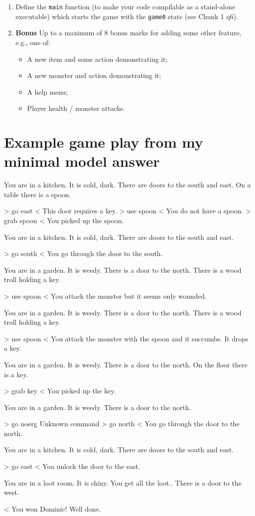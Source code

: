 \documentclass{article}
\newcommand{\topMarks}[1]{\marginnote{(#1 marks)}}
\begin{document}
\begin{enumerate}[leftmargin=1.4em,resume]
\item \topMarks{1} Define the \texttt{main} function (to make your
code compilable as a stand-alone executable) which starts the game
with the \texttt{game0} state (see Chunk 1 q6).

\item \topMarks{8} \textbf{Bonus} Up to a maximum of 8 bonus marks for
adding some other feature, e.g., one of:
%
\begin{itemize}
\item A new item and some action demonstrating it;
\item A new monster and action demonstrating it;
\item A help menu;
\item Player health / monster attacks.
\end{itemize}
%
\end{enumerate}
%

\newpage

\appendix

\section{Example game play from my minimal model answer}

\begin{EVerbatim}
   You are in a kitchen. It is cold, dark.
   There are doors to the south and east.
   On a table there is a spoon.

> go east
< This door requires a key.
> use spoon
< You do not have a spoon.
> grab spoon
< You picked up the spoon.

   You are in a kitchen. It is cold, dark.
   There are doors to the south and east.

> go south
< You go through the door to the south.

   You are in a garden. It is weedy.
   There is a door to the north.
   There is a wood troll holding a key.

> use spoon
< You attack the monster but it seems only wounded.

   You are in a garden. It is weedy.
   There is a door to the north.
   There is a wood troll holding a key.

> use spoon
< You attack the monster with the spoon and it succumbs. It drops a key.

   You are in a garden. It is weedy.
   There is a door to the north.
   On the floor there is a key.

> grab key
< You picked up the key.

   You are in a garden. It is weedy.
   There is a door to the north.

> go noerg
Unknown command
> go north
< You go through the door to the north.

   You are in a kitchen. It is cold, dark.
   There are doors to the south and east.

> go east
< You unlock the door to the east.

   You are in a loot room. It is shiny. You get all the loot..
   There is a door to the west.

< You won Dominic! Well done.
\end{EVerbatim}
\end{document}
